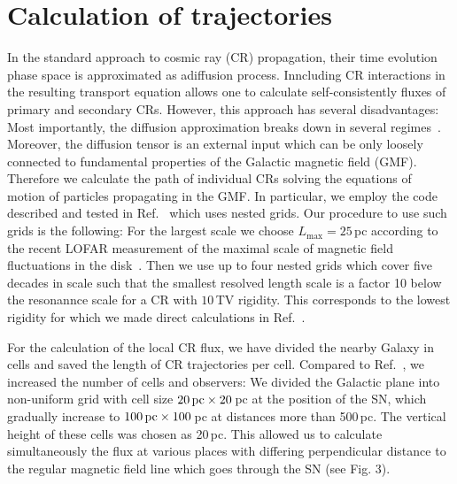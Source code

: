 \documentclass[prd,aps,twocolumn]{revtex4}
\begin{document}
\appendix


\section{Calculation of trajectories}


In the standard approach to cosmic ray (CR) propagation, their time evolution
phase space is approximated as adiffusion process. Inncluding CR interactions 
in the resulting transport equation allows one to calculate
self-consistently fluxes of primary and secondary CRs. However, this approach
has several disadvantages: Most importantly, the diffusion approximation
breaks down in several regimes~\cite{GKS14,1,2}. Moreover, the diffusion tensor
is an external input which can be only loosely connected to fundamental 
properties of the Galactic magnetic field (GMF). Therefore we  calculate 
the path of individual CRs solving the equations of motion of particles 
propagating in the GMF. In particular, we employ the code described and 
tested in Ref.~\cite{0}  which uses nested grids. Our procedure to use 
such grids is the following:  For the largest scale we choose $L_{\max}=25$\,pc 
according to the recent LOFAR measurement of the maximal scale of magnetic 
field fluctuations in the disk~\cite{LOFAR}. Then we use up to four nested 
grids which cover five decades in scale such that the  smallest resolved
length scale is a factor 10 below the resonannce scale for a CR with $10$\,TV
rigidity. This corresponds to the lowest rigidity for which  we made direct 
calculations in Ref.~\cite{PRL}. 



For the calculation of the local CR flux, we have divided the nearby 
Galaxy in cells and saved the length of CR trajectories per cell.
Compared to Ref.~\cite{PRL}, we increased the number of cells and observers:
We  divided the Galactic plane into non-uniform grid with cell size 
$20\,{\rm pc}\times 20$\,pc at the position of the SN, which gradually 
increase to $100\,{\rm pc}\times 100$\,pc at distances  more than 500\,pc.
The vertical height of these cells was chosen as 20\,pc. 
This allowed us to calculate simultaneously the flux at various places
with differing perpendicular distance to the regular magnetic field line 
which goes through the SN (see Fig. 3).
\end{document}
